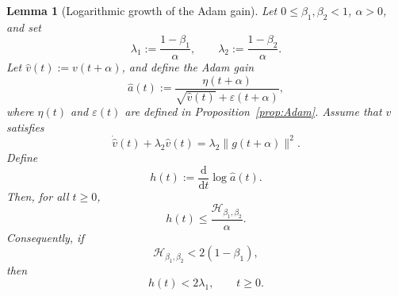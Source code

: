 \documentclass{article} %
\newtheorem{lemma}{Lemma}
\begin{document}
\begin{lemma}[Logarithmic growth of the Adam gain]
\label{lem:h_bound_shifted_adam}
Let \(0\leq\beta_1,\beta_2<1\), \(\alpha>0\), and set
\[
    \lambda_1:=\frac{1-\beta_1}{\alpha},
    \qquad
    \lambda_2:=\frac{1-\beta_2}{\alpha}.
\]
Let $\widehat v(t):=v(t+\alpha)$, and define the Adam gain
\begin{equation}\label{eq:ahat_lemma_def}
    \widehat a(t)
    :=
    \frac{\eta(t+\alpha)}
    {\sqrt{\widehat v(t)}+\varepsilon(t+\alpha)},
\end{equation}
where $\eta(t)$ and $\varepsilon(t)$ are defined in Proposition~\ref{prop:Adam}. Assume that \(\widehat v\) satisfies
\[
    \dot{\widehat v}(t)+\lambda_2\widehat v(t)
    =
    \lambda_2\|g(t+\alpha)\|^2.
\]
Define
\[
    h(t):=\frac{\mathrm d}{\mathrm dt}\log \widehat a(t).
\]
Then, for all \(t\geq0\),
\begin{equation}\label{eq:h_bound_by_H}
    h(t)
    \leq
    \frac{\mathcal H_{\beta_1,\beta_2}}{\alpha}.
\end{equation}
Consequently, if
\[
    \mathcal H_{\beta_1,\beta_2}<2(1-\beta_1),
\]
then
\begin{equation}\label{eq:h_less_than_2lambda}
    h(t)<2\lambda_1,
    \qquad t\geq0.
\end{equation}
\end{lemma}
\end{document}
